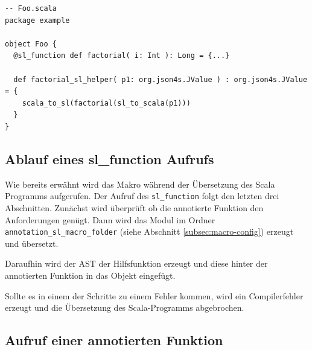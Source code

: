 \documentclass[12pt,bibtotoc]{scrreprt}
\begin{document}
\begin{lstlisting}[caption=Hilfsfunktion zur Funktion aus Listing \ref{lst:example-function}, label=lst:helperfunction, float=h]
-- Foo.scala
package example

object Foo {
  @sl_function def factorial( i: Int ): Long = {...}
  
  def factorial_sl_helper( p1: org.json4s.JValue ) : org.json4s.JValue = {
    scala_to_sl(factorial(sl_to_scala(p1)))
  }
}
\end{lstlisting}

\subsection{Ablauf eines sl\_function Aufrufs}

Wie bereits erwähnt wird das Makro während der Übersetzung des Scala Programms aufgerufen. Der Aufruf des \lstinline!sl_function! folgt den letzten drei Abschnitten. Zunächst wird überprüft ob die annotierte Funktion den Anforderungen genügt. Dann wird das Modul im Ordner \lstinline!annotation_sl_macro_folder! (siehe Abschnitt \ref{subsec:macro-config}) erzeugt und übersetzt.

Daraufhin wird der \ac{AST} der Hilfsfunktion erzeugt und diese hinter der annotierten Funktion in das Objekt eingefügt. 

Sollte es in einem der Schritte zu einem Fehler kommen, wird ein Compilerfehler erzeugt und die Übersetzung des Scala-Programms abgebrochen.

\subsection{Aufruf einer annotierten Funktion}
\label{subs:call-scala-functions}
\end{document}
